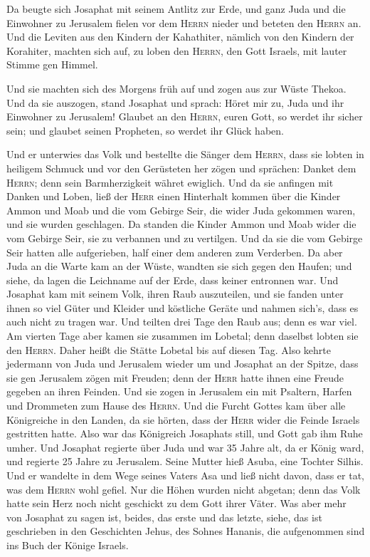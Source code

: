  Da beugte sich Josaphat mit seinem Antlitz zur Erde, und
ganz Juda und die Einwohner zu Jerusalem fielen vor dem \textsc{Herrn}
nieder und beteten den \textsc{Herrn} an.  Und die
Leviten aus den Kindern der Kahathiter, nämlich von den Kindern der
Korahiter, machten sich auf, zu loben den \textsc{Herrn}, den Gott
Israels, mit lauter Stimme gen Himmel.

 Und sie machten sich des Morgens früh auf und zogen aus
zur Wüste Thekoa. Und da sie auszogen, stand Josaphat und sprach: Höret
mir zu, Juda und ihr Einwohner zu Jerusalem! Glaubet an den
\textsc{Herrn}, euren Gott, so werdet ihr sicher sein; und glaubet
seinen Propheten, so werdet ihr Glück haben.

 Und er unterwies das Volk und bestellte die Sänger dem
\textsc{Herrn}, dass sie lobten in heiligem Schmuck und vor den
Gerüsteten her zögen und sprächen: Danket dem \textsc{Herrn}; denn sein
Barmherzigkeit währet ewiglich.  Und da sie anfingen mit
Danken und Loben, ließ der \textsc{Herr} einen Hinterhalt kommen über
die Kinder Ammon und Moab und die vom Gebirge Seir, die wider Juda
gekommen waren, und sie wurden geschlagen.  Da standen
die Kinder Ammon und Moab wider die vom Gebirge Seir, sie zu verbannen
und zu vertilgen. Und da sie die vom Gebirge Seir hatten alle
aufgerieben, half einer dem anderen zum Verderben.  Da
aber Juda an die Warte kam an der Wüste, wandten sie sich gegen den
Haufen; und siehe, da lagen die Leichname auf der Erde, dass keiner
entronnen war.  Und Josaphat kam mit seinem Volk, ihren
Raub auszuteilen, und sie fanden unter ihnen so viel Güter und Kleider
und köstliche Geräte und nahmen sich's, dass es auch nicht zu tragen
war. Und teilten drei Tage den Raub aus; denn es war viel.
 Am vierten Tage aber kamen sie zusammen im Lobetal; denn
daselbst lobten sie den \textsc{Herrn}. Daher heißt die Stätte Lobetal
bis auf diesen Tag.  Also kehrte jedermann von Juda und
Jerusalem wieder um und Josaphat an der Spitze, dass sie gen Jerusalem
zögen mit Freuden; denn der \textsc{Herr} hatte ihnen eine Freude
gegeben an ihren Feinden.  Und sie zogen in Jerusalem ein
mit Psaltern, Harfen und Drommeten zum Hause des \textsc{Herrn}.
 Und die Furcht Gottes kam über alle Königreiche in den
Landen, da sie hörten, dass der \textsc{Herr} wider die Feinde Israels
gestritten hatte.  Also war das Königreich Josaphats
still, und Gott gab ihm Ruhe umher.  Und Josaphat
regierte über Juda und war 35 Jahre alt, da er König ward, und regierte
25 Jahre zu Jerusalem. Seine Mutter hieß Asuba, eine Tochter Silhis.
 Und er wandelte in dem Wege seines Vaters Asa und ließ
nicht davon, dass er tat, was dem \textsc{Herrn} wohl gefiel.
 Nur die Höhen wurden nicht abgetan; denn das Volk hatte
sein Herz noch nicht geschickt zu dem Gott ihrer Väter. 
Was aber mehr von Josaphat zu sagen ist, beides, das erste und das
letzte, siehe, das ist geschrieben in den Geschichten Jehus, des Sohnes
Hananis, die aufgenommen sind ins Buch der Könige Israels.

